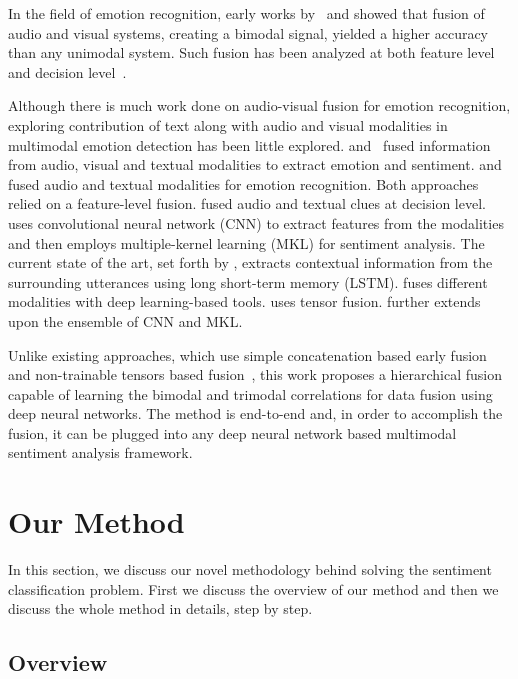 \documentclass[review]{elsarticle}
\newcommand\?[1]{\hl{#1}}
\begin{document}
In the field of emotion recognition, early works by~\citet{de1997facial} and
\citet{chen1998multimodal} showed that fusion of audio and visual
systems, creating a bimodal signal, yielded a higher accuracy than any unimodal
system. Such fusion has been analyzed at both feature
level~\citep{kessous2010multimodal} and decision
level~\citep{schuller2011recognizing}.

Although there is much work done on audio-visual fusion for emotion recognition,
exploring contribution of text along with audio and visual modalities in
multimodal emotion detection has been little
explored. \citet{wollmer2013youtube} and~\citet{rozgic2012ensemble} fused
information from audio, visual and textual modalities to extract emotion and
sentiment. \citet{metallinou2008audio} and~\citet{eyben2010line} fused audio and
textual modalities for emotion recognition. Both approaches relied on a
feature-level fusion. \citet{wu2011emotion} fused audio and textual clues at
decision level. \citet{pordee} uses convolutional neural network (CNN) to
extract features from the modalities and then employs multiple-kernel learning
(MKL) for sentiment analysis. The current state of the art, set forth by
\citet{porcon}, extracts contextual information from the surrounding utterances
using long short-term memory (LSTM). \citet{porrev} fuses different
modalities with deep learning-based tools. \citet{zadten} uses tensor
fusion. \citet{porens} further extends upon the ensemble of CNN and MKL.

Unlike existing approaches, which use simple concatenation based early fusion~\citep{pordee,pordep} and non-trainable tensors based fusion~\citep{zadten}, this work proposes a hierarchical fusion capable of learning the bimodal and trimodal correlations for data fusion using deep neural networks. The method is end-to-end and, in order to accomplish the fusion, it can be plugged into any deep neural network based multimodal sentiment analysis framework. 

\section{Our Method}
\label{sec:model}

In this section, we discuss our novel methodology behind solving the sentiment
classification problem. First we discuss the overview of our method and then we
discuss the whole method in details, step by step.

\subsection{Overview}
\label{sec:overview}
\end{document}
